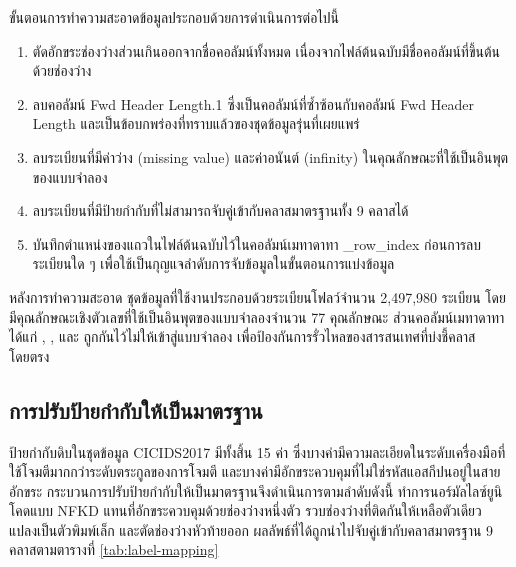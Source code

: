 ขั้นตอนการทำความสะอาดข้อมูลประกอบด้วยการดำเนินการต่อไปนี้

\begin{enumerate}
    \item ตัดอักขระช่องว่างส่วนเกินออกจากชื่อคอลัมน์ทั้งหมด เนื่องจากไฟล์ต้นฉบับมีชื่อคอลัมน์ที่ขึ้นต้นด้วยช่องว่าง
    \item ลบคอลัมน์ Fwd Header Length.1 ซึ่งเป็นคอลัมน์ที่ซ้ำซ้อนกับคอลัมน์ Fwd Header Length และเป็นข้อบกพร่องที่ทราบแล้วของชุดข้อมูลรุ่นที่เผยแพร่
    \item ลบระเบียนที่มีค่าว่าง (missing value) และค่าอนันต์ (infinity) ในคุณลักษณะที่ใช้เป็นอินพุตของแบบจำลอง
    \item ลบระเบียนที่มีป้ายกำกับที่ไม่สามารถจับคู่เข้ากับคลาสมาตรฐานทั้ง 9 คลาสได้
    \item บันทึกตำแหน่งของแถวในไฟล์ต้นฉบับไว้ในคอลัมน์เมทาดาทา \_row\_index ก่อนการลบระเบียนใด ๆ เพื่อใช้เป็นกุญแจลำดับการจับข้อมูลในขั้นตอนการแบ่งข้อมูล
\end{enumerate}

หลังการทำความสะอาด ชุดข้อมูลที่ใช้งานประกอบด้วยระเบียนโฟลว์จำนวน 2,497,980 ระเบียน โดยมีคุณลักษณะเชิงตัวเลขที่ใช้เป็นอินพุตของแบบจำลองจำนวน 77 คุณลักษณะ ส่วนคอลัมน์เมทาดาทา ได้แก่ , ,  และ  ถูกกันไว้ไม่ให้เข้าสู่แบบจำลอง เพื่อป้องกันการรั่วไหลของสารสนเทศที่บ่งชี้คลาสโดยตรง

\subsection{การปรับป้ายกำกับให้เป็นมาตรฐาน}

ป้ายกำกับดิบในชุดข้อมูล CICIDS2017 มีทั้งสิ้น 15 ค่า ซึ่งบางค่ามีความละเอียดในระดับเครื่องมือที่ใช้โจมตีมากกว่าระดับตระกูลของการโจมตี และบางค่ามีอักขระควบคุมที่ไม่ใช่รหัสแอสกีปนอยู่ในสายอักขระ กระบวนการปรับป้ายกำกับให้เป็นมาตรฐานจึงดำเนินการตามลำดับดังนี้ ทำการนอร์มัลไลซ์ยูนิโคดแบบ NFKD แทนที่อักขระควบคุมด้วยช่องว่างหนึ่งตัว รวบช่องว่างที่ติดกันให้เหลือตัวเดียว แปลงเป็นตัวพิมพ์เล็ก และตัดช่องว่างหัวท้ายออก ผลลัพธ์ที่ได้ถูกนำไปจับคู่เข้ากับคลาสมาตรฐาน 9 คลาสตามตารางที่ \ref{tab:label-mapping}

